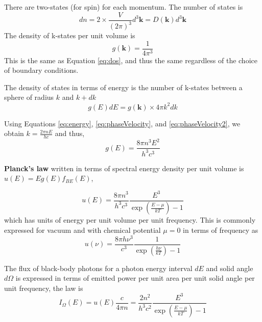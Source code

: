 \documentclass[12pt]{article}
\begin{document}
There are two-states (for spin) for each momentum.  The number of states is 
\begin{equation}
dn = 2 \times \frac{V}{(2 \pi)^3}d^3\mathbf{k} = D(\mathbf{k})d^3\mathbf{k}
\end{equation}
The density of k-states per unit volume is 
\begin{equation}
\boxed{g(\mathbf{k}) = \frac{1}{4 \pi^3}}
\end{equation}
This is the same as Equation \ref{eq:dos}, and thus the same regardless of the choice of boundary conditions.  

The density of states in terms of energy is the number of k-states between a sphere of radius $k$ and $k + dk$
\begin{equation}
g(E)dE = g(\mathbf{k}) \times 4 \pi k^2 dk \label{eq:dosEnergy}
\end{equation}

Using Equations \ref{eq:energy}, \ref{eq:phaseVelocity}, and \ref{eq:phaseVelocity2}, we obtain $k = \frac{2 \pi n E}{h c}$ and thus, 
\begin{equation}
g(E) = \frac{8 \pi n^3 E^2}{h^3 c^3}
\end{equation}


\textbf{Planck's law} written in terms of spectral energy density per unit volume is $u(E) = E g(E) f_{BE}(E)$,

\begin{equation}
u(E) = \frac{8 \pi n^3}{h^3 c^3} \frac{E^3}{\exp({\frac{E - \mu}{k T}}) -1} 
\end{equation}
which has units of energy per unit volume per unit frequency.
This is commonly expressed for vacuum and with chemical potential $\mu = 0$ in terms of frequency as 
\begin{equation}
\boxed{u(\nu) = \frac{8 \pi h \nu^3}{c^3} \frac{1}{\exp({\frac{h \nu}{k T}}) -1}}
\end{equation}

The flux of black-body photons for a photon energy interval $dE$ and solid angle $d \Omega$ is expressed in terms of emitted power per unit area per unit solid angle per unit frequency, the law is 
\begin{equation}
I_\Omega(E) = u(E) \frac{c}{4 \pi n} = \frac{2 n^2}{h^3 c^2} \frac{E^3}{\exp({\frac{E - \mu}{k T}}) -1}
\end{equation}
\end{document}
